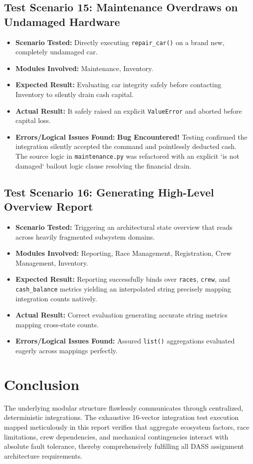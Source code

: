 \documentclass[12pt,a4paper]{article}
\begin{document}
\subsection{Test Scenario 15: Maintenance Overdraws on Undamaged Hardware}
\begin{itemize}
    \item \textbf{Scenario Tested:} Directly executing \texttt{repair\_car()} on a brand new, completely undamaged car.
    \item \textbf{Modules Involved:} Maintenance, Inventory.
    \item \textbf{Expected Result:} Evaluating car integrity safely before contacting Inventory to silently drain cash capital.
    \item \textbf{Actual Result:} It safely raised an explicit \texttt{ValueError} and aborted before capital loss.
    \item \textbf{Errors/Logical Issues Found:} \textbf{Bug Encountered!} Testing confirmed the integration silently accepted the command and pointlessly deducted cash. The source logic in \texttt{maintenance.py} was refactored with an explicit `is not damaged` bailout logic clause resolving the financial drain.
\end{itemize}

\subsection{Test Scenario 16: Generating High-Level Overview Report}
\begin{itemize}
    \item \textbf{Scenario Tested:} Triggering an architectural state overview that reads across heavily fragmented subsystem domains.
    \item \textbf{Modules Involved:} Reporting, Race Management, Registration, Crew Management, Inventory.
    \item \textbf{Expected Result:} Reporting successfully binds over \texttt{races}, \texttt{crew}, and \texttt{cash\_balance} metrics yielding an interpolated string precisely mapping integration counts natively.
    \item \textbf{Actual Result:} Correct evaluation generating accurate string metrics mapping cross-state counts.
    \item \textbf{Errors/Logical Issues Found:} Assured \texttt{list()} aggregations evaluated eagerly across mappings perfectly.
\end{itemize}

\section{Conclusion}
The underlying modular structure flawlessly communicates through centralized, deterministic integrations. The exhaustive 16-vector integration test execution mapped meticulously in this report verifies that aggregate ecosystem factors, race limitations, crew dependencies, and mechanical contingencies interact with absolute fault tolerance, thereby comprehensively fulfilling all DASS assignment architecture requirements.
\end{document}
